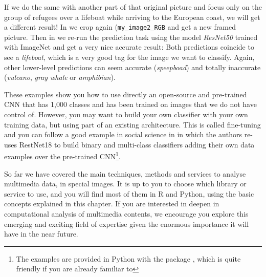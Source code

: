 If we do the same with another part of that original picture and focus only on the  group of refugees over a lifeboat while arriving to the European coast, we will get a different result! In  we crop again (\texttt{my\_image2\_RGB} and get a new framed picture. Then in  we re-run the prediction task using the model \textit{ResNet50} trained with ImageNet and get a very nice accurate result: Both predictions coincide to see a \textit{lifeboat}, which is a very good tag for the image we want to classify. Again, other lower-level predictions can seem accurate (\textit{speepboad}) and totally inaccurate (\textit{vulcano}, \textit{gray whale} or \textit{amphibian}).



These examples show you how to use directly an open-source and pre-trained CNN that has 1,000 classes and has been trained on images that we do not have control of. However, you may want to build your own classifier with your own training data, but using part of an existing architecture. This is called fine-tuning and you can follow a good example in social science in \citet{williams2020images} in which the authors re-uses RestNet18 to build binary and multi-class classifiers adding their own data examples over the pre-trained CNN\footnote{The examples are provided in Python with the package , which is quite friendly if you are already familiar to  }. 

So far we have covered the main techniques, methods and services to analyse multimedia data, in special images. It is up to you to choose which library or service to use, and you will find most of them in R and Python, using the basic concepts explained in this chapter. If you are interested in deepen in computational analysis of multimedia contents, we encourage you explore this emerging and exciting field of expertise given the enormous importance it will have in the near future. 
